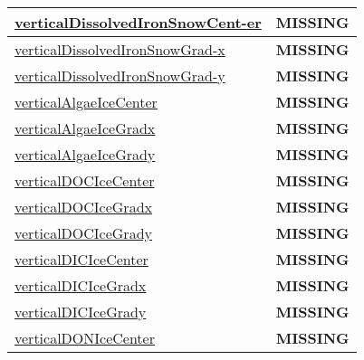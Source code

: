 {\begin{center}
\begin{longtable}{| p{2.0in} | p{4.0in} |}
    \hline
    \hyperref[subsec:var_sec_tracer_reconstruction_verticalDissolvedIronSnowCenter]{verticalDissolvedIronSnowCent-}\hyperref[subsec:var_sec_tracer_reconstruction_verticalDissolvedIronSnowCenter]{er  }& {\bf \color{red} MISSING} \\
    \hline
    \hyperref[subsec:var_sec_tracer_reconstruction_verticalDissolvedIronSnowGradx]{verticalDissolvedIronSnowGrad-}\hyperref[subsec:var_sec_tracer_reconstruction_verticalDissolvedIronSnowGradx]{x  }& {\bf \color{red} MISSING} \\
    \hline
    \hyperref[subsec:var_sec_tracer_reconstruction_verticalDissolvedIronSnowGrady]{verticalDissolvedIronSnowGrad-}\hyperref[subsec:var_sec_tracer_reconstruction_verticalDissolvedIronSnowGrady]{y  }& {\bf \color{red} MISSING} \\
    \hline
    \hyperref[subsec:var_sec_tracer_reconstruction_verticalAlgaeIceCenter]{verticalAlgaeIceCenter} & {\bf \color{red} MISSING} \\
    \hline
    \hyperref[subsec:var_sec_tracer_reconstruction_verticalAlgaeIceGradx]{verticalAlgaeIceGradx} & {\bf \color{red} MISSING} \\
    \hline
    \hyperref[subsec:var_sec_tracer_reconstruction_verticalAlgaeIceGrady]{verticalAlgaeIceGrady} & {\bf \color{red} MISSING} \\
    \hline
    \hyperref[subsec:var_sec_tracer_reconstruction_verticalDOCIceCenter]{verticalDOCIceCenter} & {\bf \color{red} MISSING} \\
    \hline
    \hyperref[subsec:var_sec_tracer_reconstruction_verticalDOCIceGradx]{verticalDOCIceGradx} & {\bf \color{red} MISSING} \\
    \hline
    \hyperref[subsec:var_sec_tracer_reconstruction_verticalDOCIceGrady]{verticalDOCIceGrady} & {\bf \color{red} MISSING} \\
    \hline
    \hyperref[subsec:var_sec_tracer_reconstruction_verticalDICIceCenter]{verticalDICIceCenter} & {\bf \color{red} MISSING} \\
    \hline
    \hyperref[subsec:var_sec_tracer_reconstruction_verticalDICIceGradx]{verticalDICIceGradx} & {\bf \color{red} MISSING} \\
    \hline
    \hyperref[subsec:var_sec_tracer_reconstruction_verticalDICIceGrady]{verticalDICIceGrady} & {\bf \color{red} MISSING} \\
    \hline
    \hyperref[subsec:var_sec_tracer_reconstruction_verticalDONIceCenter]{verticalDONIceCenter} & {\bf \color{red} MISSING} \\

\end{longtable}
\end{center}}
